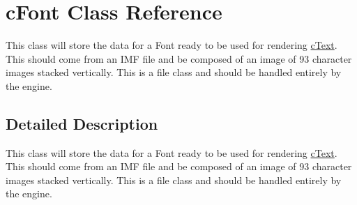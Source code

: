 \hypertarget{classc_font}{
\section{cFont Class Reference}
\label{classc_font}
}


This class will store the data for a Font ready to be used for rendering \hyperlink{classc_text}{cText}. This should come from an IMF file and be composed of an image of 93 character images stacked vertically. This is a file class and should be handled entirely by the engine.  




\subsection{Detailed Description}
This class will store the data for a Font ready to be used for rendering \hyperlink{classc_text}{cText}. This should come from an IMF file and be composed of an image of 93 character images stacked vertically. This is a file class and should be handled entirely by the engine. 